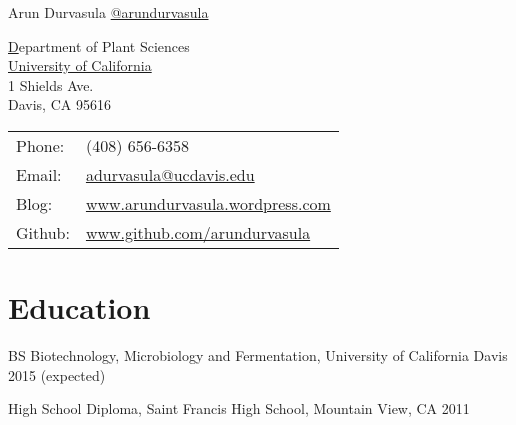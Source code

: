 \documentclass[letterpaper]{article}
\def\name{Arun Durvasula}
\renewenvironment{itemize}{
  \begin{list}{}{
    \setlength{\leftmargin}{1.5em}
  }
}{
  \end{list}
}
\begin{document}
{\huge \name}
\newline
 \href{https://www.twitter.com/arundurvasula}{@arundurvasula}


\vspace{0.25in}

\begin{minipage}{0.55\linewidth}
  \href{http://www.plantsciences.ucdavis.edu/plantsciences/}Department of Plant Sciences\\
  \href{http://www.ucdavis.edu/}{University of California} \\
  1 Shields Ave.\\
  Davis, CA 95616
\end{minipage}
\begin{minipage}{0.35\linewidth}
  \begin{tabular}{ll}
    Phone: & (408) 656-6358 \\
    Email: & \href{mailto:adurvasula@ucdavis.edu}{adurvasula@ucdavis.edu} \\
    Blog: & \href{http://www.arundurvasula.wordpress.com/}{www.arundurvasula.wordpress.com} \\
    Github: & \href{https://github.com/arundurvasula/}{www.github.com/arundurvasula} \\
  \end{tabular}
\end{minipage}

\section*{Education}
\begin{itemize}
 \item BS Biotechnology, Microbiology and Fermentation, University of California Davis 2015 (expected)
 \item High School Diploma, Saint Francis High School, Mountain View, CA 2011
\end{itemize}

\end{document}
